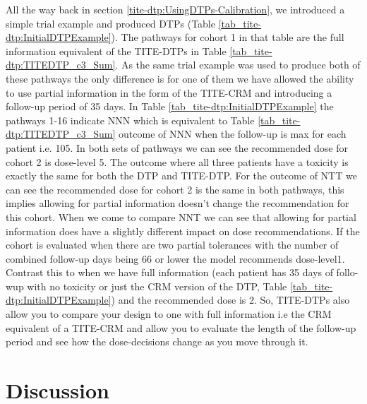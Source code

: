 All the way back in section \ref{tite-dtp:UsingDTPs-Calibration}, we introduced a simple trial example and produced DTPs (Table \ref{tab_tite-dtp:InitialDTPExample}). The pathways for cohort 1 in that table are the full information equivalent of the TITE-DTPs in Table \ref{tab_tite-dtp:TITEDTP_c3_Sum}. As the same trial example was used to produce both of these pathways the only difference is for one of them we have allowed the ability to use partial information in the form of the TITE-CRM and introducing a follow-up period of 35 days. In Table \ref{tab_tite-dtp:InitialDTPExample} the pathways 1-16 indicate NNN which is equivalent to Table \ref{tab_tite-dtp:TITEDTP_c3_Sum} outcome of NNN when the follow-up is max for each patient i.e. 105. In both sets of pathways we can see the recommended dose for cohort 2 is dose-level 5. The outcome where all three patients have a toxicity is exactly the same for both the DTP and TITE-DTP. For the outcome of NTT we can see the recommended dose for cohort 2 is the same in both pathways, this implies allowing for partial information doesn't change the recommendation for this cohort. When we come to compare NNT we can see that allowing for partial information does have a slightly different impact on dose recommendations. If the cohort is evaluated when there are two partial tolerances with the number of combined follow-up days being 66 or lower the model recommends dose-level1. Contrast this to when we have full information (each patient has 35 days of follo-wup with no toxicity or just the CRM version of the DTP, Table \ref{tab_tite-dtp:InitialDTPExample}) and the recommended dose is 2. So, TITE-DTPs also allow you to compare your design to one with full information i.e the CRM equivalent of a TITE-CRM and allow you to evaluate the length of the follow-up period and see how the dose-decisions change as you move through it. 


\section{Discussion}
\label{tite-dtp:Discussion}


